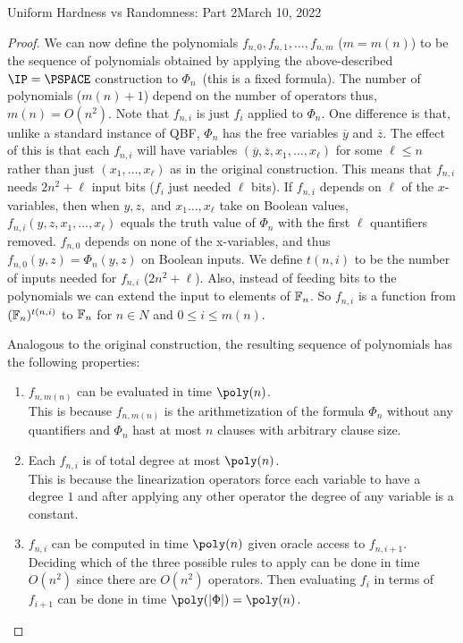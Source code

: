 \begin{lecture}{8}{Uniform Hardness vs Randomness: Part 2}{March 10, 2022}
\begin{proof}
We can now define the polynomials $f_{n,0}, f_{n,1},\ldots , f_{n,m}$ ($m = m(n)$) to be the sequence of polynomials obtained by applying the above-described $\IP = \PSPACE$ construction to $\Phi_n$~(this is a fixed formula). The number of polynomials ($m(n)+1$) depend on the number of operators thus, $m(n)=O(n^2)$. 
Note that $f_{n,i}$ is just $f_i$ applied to $\Phi_n$. 
One difference is that, unlike a standard instance of QBF, $\Phi_n$ has the free variables $\overline{y}$ and $\overline{z}$. The effect of this is that each $f_{n,i}$ will have variables $(\overline{y}, \overline{z}, x_1,\ldots, x_{\ell})$ for some $\ell \leq n$ rather than just $(x_1, \ldots , x_{\ell})$ as in the original construction. This means that $f_{n,i}$ needs $2n^2 + \ell$ input bits ($f_i$ just needed $\ell$ bits). 
If $f_{n,i}$ depends on $\ell$ of the $x$-variables, then when $y, z,$ and $x_1 \ldots , x_{\ell}$ take on Boolean values, $f_{n,i}(y, z, x_1, \ldots , x_{\ell})$ equals the truth value of $\Phi_n$ with the first $\ell$ quantifiers removed. $f_{n,0}$ depends on none of the x-variables, and thus $f_{n,0}(y, z) = \Phi_n(y, z)$ on Boolean inputs. We define $t(n,i)$ to be the number of inputs needed for $f_{n,i}$ ($2n^2+\ell$). Also, instead of feeding bits to the polynomials we can extend the input to elements of $\mathbb{F}_n$. So $f_{n,i}$ is a function from $(\mathbb{F}_n)^{t(n,i)}$ to $\mathbb{F}_n$ for $n \in N$ and $0 \leq i \leq m(n)$.

Analogous to the original construction, the resulting sequence of polynomials has the following properties:
\begin{enumerate}
	\item $f_{n,m(n)}$ can be evaluated in time $\poly(n)$. \\
	This is because $f_{n,m(n)}$ is the arithmetization of the formula $\Phi_n$ without any quantifiers and $\Phi_n$ hast at most $n$ clauses with arbitrary clause size. 
	
	\item Each $f_{n,i}$ is of total degree at most $\poly(n)$. \\
	This is because the linearization operators force each variable to have a degree $1$ and after applying any other operator the degree of any variable is a constant.
	
	\item $f_{n,i}$ can be computed in time $\poly(n)$ given oracle access to $f_{n,i+1}$. \\
	Deciding which of the three possible rules to apply can be done in time $O(n^2)$ since there are $O(n^2)$ operators. Then evaluating $f_i$ in terms of $f_{i+1}$ can be done in time $\poly(\card{\Phi}) = \poly(n)$.
\end{enumerate}


\end{proof}
\end{lecture}
